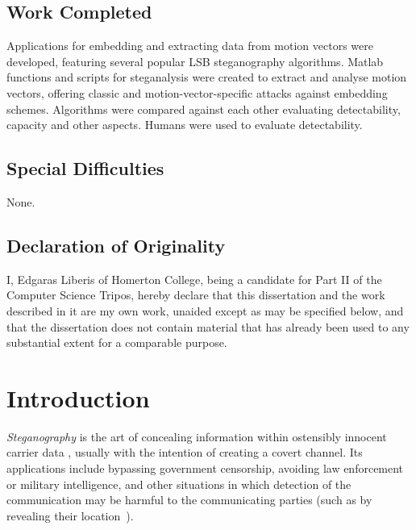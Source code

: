 \documentclass[12pt,british,twoside,notitlepage,usenames,dvipsnames,hypens,final]{report}
\renewcommand\thesubsection{\arabic{subsection}.}
\numberwithin{equation}{section}
\numberwithin{figure}{section}
\begin{document}
\section*{Work Completed}

Applications for embedding and extracting data from motion vectors were developed, featuring several popular LSB steganography algorithms. Matlab functions and scripts for steganalysis were created to extract and analyse motion vectors, offering classic and motion-vector-specific attacks against embedding schemes. Algorithms were compared against each other evaluating detectability, capacity and other aspects. Humans were used to evaluate detectability.

\section*{Special Difficulties}

None.

\cleardoublepage

\section*{Declaration of Originality}
I, Edgaras Liberis of Homerton College, being a candidate for Part II of the Computer Science Tripos, hereby declare that this dissertation and the work described in it are my own work, unaided except as may be specified below, and that the dissertation does not contain material that has already been used to any substantial extent for a comparable purpose.

\bigskip
{}

\medskip
{}

\cleardoublepage
\tableofcontents
\renewcommand{\thesection}{\arabic{chapter}.\arabic{section}}
\renewcommand{\thesubsection}{\arabic{chapter}.\arabic{section}.\arabic{subsection}}
\setcounter{chapter}{0}

\cleardoublepage
\chapter{Introduction}
\pagestyle{headings}

\emph{Steganography} is the art of concealing information within ostensibly innocent carrier data \cite[p.~3]{fridrich}, usually with the intention of creating a covert channel. Its applications include bypassing government censorship, avoiding law enforcement or military intelligence, and other situations in which detection of the communication may be harmful to the communicating parties (such as by revealing their location~\cite{infohiding-survey}). 
 
\end{document}
